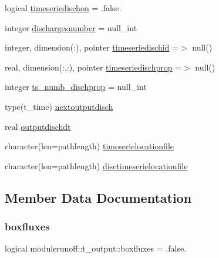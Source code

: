 \begin{DoxyCompactItemize}
logical \mbox{\hyperlink{structmodulerunoff_1_1t__output_a908872f3d7ae7842550167d476476051}{timeseriedischon}} = .false.
\item 
integer \mbox{\hyperlink{structmodulerunoff_1_1t__output_aafa675dc56ad7c731c0aca52859de307}{dischargesnumber}} = null\+\_\+int
\item 
integer, dimension(\+:), pointer \mbox{\hyperlink{structmodulerunoff_1_1t__output_a1d9eb61b0398c81f814c9a66e5867216}{timeseriedischid}} =$>$ null()
\item 
real, dimension(\+:,\+:), pointer \mbox{\hyperlink{structmodulerunoff_1_1t__output_a4157e51a3ced2694f988b8e5519605af}{timeseriedischprop}} =$>$ null()
\item 
integer \mbox{\hyperlink{structmodulerunoff_1_1t__output_aa010a2059d2015946dbccac645913605}{ts\+\_\+numb\+\_\+dischprop}} = null\+\_\+int
\item 
type(t\+\_\+time) \mbox{\hyperlink{structmodulerunoff_1_1t__output_a4efe0da9a829fe5cc5d2d8f96dcde112}{nextoutputdisch}}
\item 
real \mbox{\hyperlink{structmodulerunoff_1_1t__output_a42dc1669e4b75fe354b6a7ae36dd60cb}{outputdischdt}}
\item 
character(len=pathlength) \mbox{\hyperlink{structmodulerunoff_1_1t__output_ac69ce301b323a88ba0a79fb919b3dc74}{timeserielocationfile}}
\item 
character(len=pathlength) \mbox{\hyperlink{structmodulerunoff_1_1t__output_ae0bb084927f44fa0438d0f599b2333d8}{disctimeserielocationfile}}
\end{DoxyCompactItemize}


\subsection{Member Data Documentation}
\mbox{\label{structmodulerunoff_1_1t__output_a524e219e846806137478ae23d1a8ebb6}} 
\subsubsection{\texorpdfstring{boxfluxes}{boxfluxes}}
{\footnotesize\ttfamily logical modulerunoff\+::t\+\_\+output\+::boxfluxes = .false.\hspace{0.3cm}{\ttfamily [private]}}

